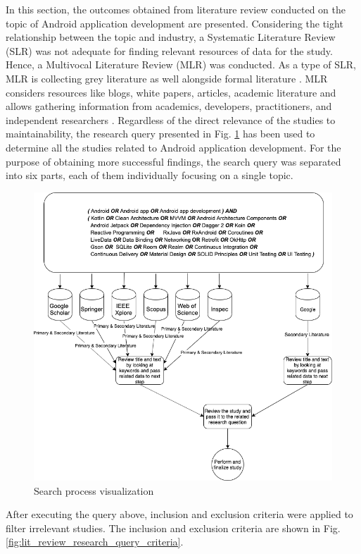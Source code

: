 In this section, the outcomes obtained from literature review conducted on the topic of Android application development are presented. Considering the tight relationship between the topic and industry, a Systematic Literature Review (SLR) was not adequate for finding relevant resources of data for the study. Hence, a Multivocal Literature Review (MLR) was conducted. As a type of SLR, MLR is collecting grey literature as well alongside formal literature \cite{40}. MLR considers resources like blogs, white papers, articles, academic literature and allows gathering information from academics, developers, practitioners, and independent researchers \cite{41}. Regardless of the direct relevance of the studies to maintainability, the research query presented in Fig. \ref{fig:lit_review_research_query} has been used to determine all the studies related to Android application development. For the purpose of obtaining more successful findings, the search query was separated into six parts, each of them individually focusing on a single topic.
\begin{figure}[ht!]
    \centering
    \includegraphics[scale=0.4]{figures/research_query.png}
    \caption{Search process visualization}
    \label{fig:lit_review_research_query}
\end{figure}
\FloatBarrier

After executing the query above, inclusion and exclusion criteria were applied to filter irrelevant studies. The inclusion and exclusion criteria are shown in Fig. \ref{fig:lit_review_research_query_criteria}.

